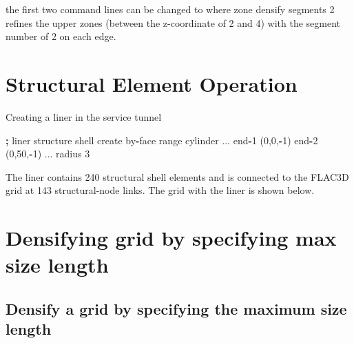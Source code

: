 \documentclass[a4paper, nobind]{templates/ociamthesis}
\newenvironment{Shaded}{\begin{snugshade}}{\end{snugshade}}
\newcommand{\BuiltInTok}[1]{#1}
\newcommand{\DecValTok}[1]{\textcolor[rgb]{0.00,0.00,0.81}{#1}}
\newcommand{\NormalTok}[1]{#1}
\newcommand{\OperatorTok}[1]{\textcolor[rgb]{0.81,0.36,0.00}{\textbf{#1}}}
\renewenvironment{Shaded}
{
  \vspace{10pt}%
  \begin{snugshade}%
}{%
  \end{snugshade}%
  \vspace{8pt}%
}
\begin{document}
the first two command lines can be changed to
where zone densify segments 2 refines the upper zones (between the z-coordinate of 2 and 4) with the segment number of 2 on each edge.

\hypertarget{structural-element-operation}{%
\section{Structural Element Operation}\label{structural-element-operation}}

Creating a liner in the service tunnel

\begin{Shaded}
\begin{Highlighting}[]
\OperatorTok{;}\NormalTok{ liner}
\NormalTok{structure shell create by}\OperatorTok{{-}}\NormalTok{face }\BuiltInTok{range}\NormalTok{ cylinder ...}
\NormalTok{                                     end}\OperatorTok{{-}}\DecValTok{1}\NormalTok{ (}\DecValTok{0}\NormalTok{,}\DecValTok{0}\NormalTok{,}\OperatorTok{{-}}\DecValTok{1}\NormalTok{) end}\OperatorTok{{-}}\DecValTok{2}\NormalTok{ (}\DecValTok{0}\NormalTok{,}\DecValTok{50}\NormalTok{,}\OperatorTok{{-}}\DecValTok{1}\NormalTok{) ...}
\NormalTok{                                     radius }\DecValTok{3}
\end{Highlighting}
\end{Shaded}

The liner contains 240 structural shell elements and is connected to the FLAC3D grid at 143 structural-node links. The grid with the liner is shown below.

\hypertarget{densifying-grid-by-specifying-max-size-length}{%
\section{Densifying grid by specifying max size length}\label{densifying-grid-by-specifying-max-size-length}}

\hypertarget{densify-a-grid-by-specifying-the-maximum-size-length}{%
\subsection{Densify a grid by specifying the maximum size length}\label{densify-a-grid-by-specifying-the-maximum-size-length}}
\end{document}

